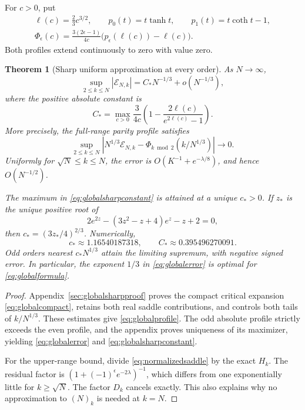 \documentclass[11pt]{article}
\newtheorem{theorem}{Theorem}[section]
\theoremstyle{definition}
\theoremstyle{remark}
\newcommand{\1}{\mathbf 1}
\begin{document}
For $c>0$, put
\begin{equation}\label{eq:globalprofiledef}
\begin{gathered}
\ell(c)=\frac23c^{3/2},\qquad
p_0(t)=t\tanh t,\qquad p_1(t)=t\coth t-1,\\
\Phi_\epsilon(c)=\frac{3(2\epsilon-1)}{4c}
\bigl(p_\epsilon(\ell(c))-\ell(c)\bigr).
\end{gathered}
\end{equation}
Both profiles extend continuously to zero with value zero.

\begin{theorem}[Sharp uniform approximation at every order]\label{thm:global}
As $N\to\infty$,
\begin{equation}\label{eq:globalerror}
\sup_{2\le k\le N}|\mathcal E_{N,k}|
=C_*N^{-1/3}+o(N^{-1/3}),
\end{equation}
where the positive absolute constant is
\begin{equation}\label{eq:globalsharpconstant}
C_*=\max_{c>0}\frac3{4c}
\left(1-\frac{2\ell(c)}{e^{2\ell(c)}-1}\right).
\end{equation}
More precisely, the full-range parity profile satisfies
\begin{equation}\label{eq:globalprofile}
\sup_{2\le k\le N}
\left|N^{1/3}\mathcal E_{N,k}
-\Phi_{k\bmod2}(k/N^{1/3})\right|\longrightarrow0.
\end{equation}
Uniformly for $\sqrt N\le k\le N$, the error is
$O(K^{-1}+e^{-\lambda/8})$, and hence $O(N^{-1/2})$.

The maximum in \eqref{eq:globalsharpconstant} is attained at a unique $c_*>0$. If $z_*$ is the unique positive root of
\begin{equation}\label{eq:globalmaxequation}
2e^{2z}-(3z^2-z+4)e^z-z+2=0,
\end{equation}
then $c_*=(3z_*/4)^{2/3}$. Numerically,
\[
c_*\approx1.16540187318,\qquad C_*\approx0.395496270091.
\]
Odd orders nearest $c_*N^{1/3}$ attain the limiting supremum, with negative signed error. In particular, the exponent $1/3$ in \eqref{eq:globalerror} is optimal for \eqref{eq:globalformula}.
\end{theorem}
\begin{proof}
Appendix~\ref{sec:globalsharpproof} proves the compact critical expansion \eqref{eq:globalcompact}, retains both real saddle contributions, and controls both tails of $k/N^{1/3}$. These estimates give \eqref{eq:globalprofile}. The odd absolute profile strictly exceeds the even profile, and the appendix proves uniqueness of its maximizer, yielding \eqref{eq:globalerror} and \eqref{eq:globalsharpconstant}.

For the upper-range bound, divide \eqref{eq:normalizedsaddle} by the exact $H_k$. The residual factor is $(1+(-1)^\epsilon e^{-2\lambda})^{-1}$, which differs from one exponentially little for $k\ge\sqrt N$. The factor $D_k$ cancels exactly. This also explains why no approximation to $(N)_k$ is needed at $k=N$.
\end{proof}
\end{document}
